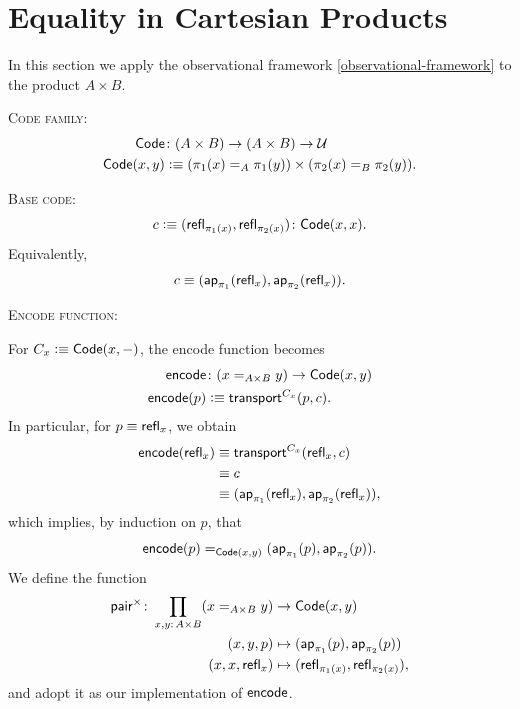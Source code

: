 \section{Equality in Cartesian Products}\label{equality-in-cartesian-products}

In this section we apply the observational framework \ref{observational-framework} to the product $A\times B$.

\textsc{Code family:}
\begin{align*}
    \fun{Code}&\colon(A\times B)\to(A\times B)\to\univ\\
    \fun{Code}(x,y)&\defeq
        (\pi_1(x)\eq A\pi_1(y))
        \times
        (\pi_2(x)\eq B\pi_2(y)).
\end{align*}

\textsc{Base code:}
\[
    c\defeq(\fun{refl}_{\pi_1(x)},\fun{refl}_{\pi_2(x)})
        \colon\fun{Code}(x,x).
\]
Equivalently,
\[
    c\equiv(\mathsf{ap}_{\pi_1}(\mathsf{refl}_x)
        ,\mathsf{ap}_{\pi_2}(\mathsf{refl}_x)).
\]

\textsc{Encode function:}

For $C_x\mathrel{\vcentcolon}\equiv\mathsf{Code}(x,{\mathord-})$, the encode function becomes
\begin{align*}
    \fun{encode}&\colon(x\eq{A\times B}y)\to\fun{Code}(x,y)\\
    \fun{encode}(p)
        &\defeq\fun{transport}^{C_x}(p,c).
\end{align*}
In particular, for $p\equiv\mathsf{refl}_x$, we obtain
\begin{align*}
    \mathsf{encode}(\mathsf{refl}_x)
        &\equiv\mathsf{transport}^{C_x}
            (\mathsf{refl}_x,c)\\
        &\equiv c\\
        &\equiv(\mathsf{ap}_{\pi_1}(\mathsf{refl}_x)
            ,\mathsf{ap}_{\pi_2}(\mathsf{refl}_x)),
\end{align*}
which implies, by induction on $p$, that
\[
    \mathsf{encode}(p)\mathrel{=_{\mathsf{Code}(x,y)}}(\mathsf{ap}_{\pi_1}(p)
        ,\mathsf{ap}_{\pi_2}(p)).
\]
We define the function
\begin{align*}
        \fun{pair}^\times\colon\prod_{x,y\colon A\times B}
            (x\eq{A\times B}y)
            &\to\fun{Code}(x,y)\\
        (x,y,p)&\mapsto
            (\fun{ap}_{\pi_1}(p),\fun{ap}_{\pi_2}(p))\\
        (x,x,\fun{refl}_x)&\mapsto
            (\fun{refl}_{\pi_1(x)},\fun{refl}_{\pi_2(x)}),
    \end{align*}
and adopt it as our implementation of $\mathsf{encode}$.


